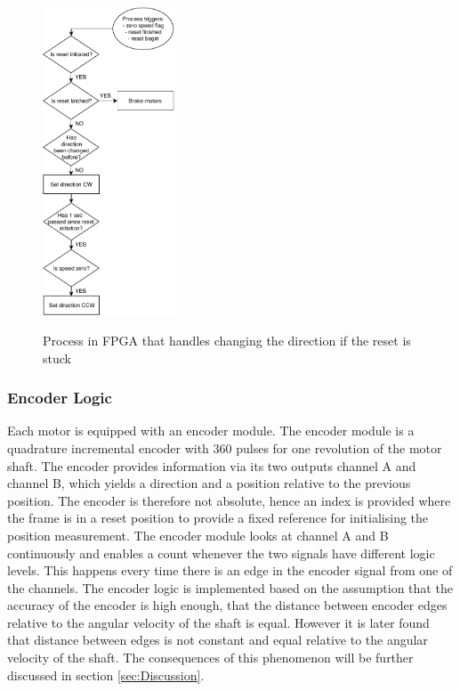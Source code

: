 \documentclass[../../main.tex]{subfiles}
\begin{document}
\begin{figure}
\centering
\caption{Process in FPGA that handles changing the direction if the reset is stuck}
\includegraphics[width = 0.35\textwidth]{Sections/System_Implementation/Images/FPGAFlowchartsResetDirection.pdf}
\label{fig:FPGAFlowchartsResetDirection}
\end{figure}

\subsubsection*{Encoder Logic}

Each motor is equipped with an encoder module. The encoder module is a quadrature incremental encoder with 360 pulses for one revolution of the motor shaft. The encoder provides information via its two outputs channel A and channel B, which yields a direction and a position relative to the previous position. The encoder is therefore not absolute, hence an index is provided where the frame is in a reset position to provide a fixed reference for initialising the position measurement.
The encoder module looks at channel A and B continuously and enables a count whenever the two signals have different logic levels. This happens every time there is an edge in the encoder signal from one of the channels. The encoder logic is implemented based on the assumption that the accuracy of the encoder is high enough, that the distance between encoder edges relative to the angular velocity of the shaft is equal. However it is later found that distance between edges is not constant and equal relative to the angular velocity of the shaft. The consequences of this phenomenon will be further discussed in section \ref{sec:Discussion}.
\end{document}
